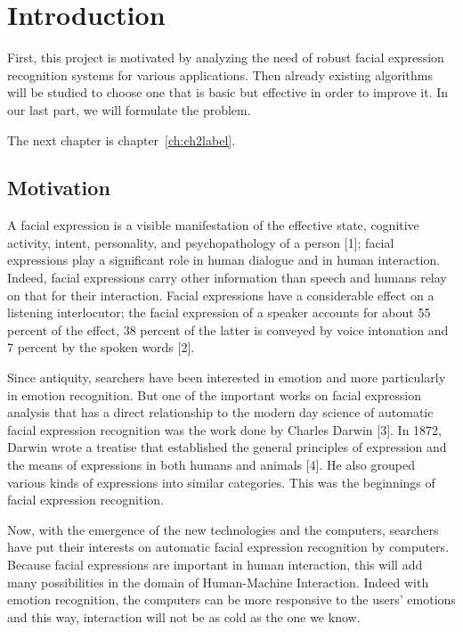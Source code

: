 \chapter{Introduction}\label{ch:introduction}

First, this project is motivated by analyzing the need of robust facial expression recognition systems for various applications. Then already existing algorithms will be studied to choose one that is basic but effective in order to improve it. In our last part, we will formulate the problem.

 The next chapter is chapter~\ref{ch:ch2label}.

\section{Motivation}

A facial expression is a visible manifestation of the effective state, cognitive activity, intent, personality, and psychopathology of a person [1]; facial expressions play a significant role in human dialogue and in human interaction. Indeed, facial expressions carry other information than speech and humans relay on that for their interaction. Facial expressions have a considerable effect on a listening interlocutor; the facial expression of a speaker accounts for about 55 percent of the effect, 38 percent of the latter is conveyed by voice intonation and 7 percent by the spoken words [2].

Since antiquity, searchers have been interested in emotion and more particularly in emotion recognition. But one of the important works on facial expression analysis that has a direct relationship to the modern day science of automatic facial expression recognition was the work done by Charles Darwin [3]. In 1872, Darwin wrote a treatise that established the general principles of expression and the means of expressions in both humans and animals [4]. He also grouped various kinds of expressions into similar categories. This was the beginnings of facial expression recognition.

Now, with the emergence of the new technologies and the computers, searchers have put their interests on automatic facial expression recognition by computers. Because facial expressions are important in human interaction, this will add many possibilities in the domain of Human-Machine Interaction. Indeed with emotion recognition, the computers can be more responsive to the users' emotions and this way, interaction will not be as cold as the one we know. 


